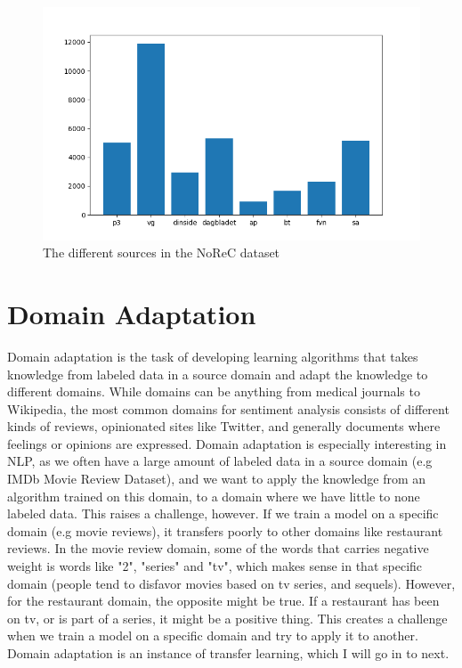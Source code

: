 \documentclass{report}
\begin{document}
\begin{figure}[h!]
	\centering
	\includegraphics[scale=0.5]{img/src_dist}
	\caption{The different sources in the NoReC dataset}
	\label{fig:sources}
\end{figure}%

\section{Domain Adaptation}
Domain adaptation is the task of developing learning algorithms that takes knowledge from labeled data in a source domain and adapt the knowledge to different domains. While domains can be anything from medical journals to Wikipedia, the most common domains for sentiment analysis consists of different kinds of reviews, opinionated sites like Twitter, and generally documents where feelings or opinions are expressed. Domain adaptation is especially interesting in NLP, as we often have a large amount of labeled data in a source domain (e.g IMDb Movie Review Dataset), and we want to apply the knowledge from an algorithm trained on this domain, to a domain where we have little to none labeled data. \cite{daume-iii-2007-frustratingly} This raises a challenge, however. If we train a model on a specific domain (e.g movie reviews), it transfers poorly to other domains like restaurant reviews. In the movie review domain, some of the words that carries negative weight is words like "2", "series" and "tv", which makes sense in that specific domain (people tend to disfavor movies based on tv series, and sequels). However, for the restaurant domain, the opposite might be true. If a restaurant has been on tv, or is part of a series, it might be a positive thing. This creates a challenge when we train a model on a specific domain and try to apply it to another. Domain adaptation is an instance of transfer learning, which I will go in to next.
\end{document}
